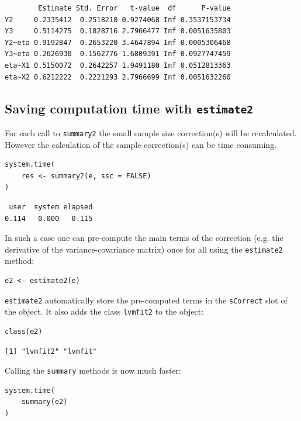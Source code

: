 \documentclass[12pt]{article}
\begin{document}
\begin{verbatim}
        Estimate Std. Error   t-value  df      P-value
Y2     0.2335412  0.2518218 0.9274068 Inf 0.3537153734
Y3     0.5114275  0.1828716 2.7966477 Inf 0.0051635803
Y2~eta 0.9192847  0.2653220 3.4647894 Inf 0.0005306468
Y3~eta 0.2626930  0.1562776 1.6809391 Inf 0.0927747459
eta~X1 0.5150072  0.2642257 1.9491180 Inf 0.0512813363
eta~X2 0.6212222  0.2221293 2.7966699 Inf 0.0051632260
\end{verbatim}

\subsection{Saving computation time with \texttt{estimate2}}
\label{sec:orgd6a6301}
For each call to \texttt{summary2} the small sample size correction(s) will
be recalculated. However the calculation of the sample correction(s)
can be time consuming.
\lstset{language=r,label= ,caption= ,captionpos=b,numbers=none}
\begin{lstlisting}
system.time(
    res <- summary2(e, ssc = FALSE)
)
\end{lstlisting}

\begin{verbatim}
 user  system elapsed 
0.114   0.000   0.115
\end{verbatim}


In such a case one can pre-compute the main terms of the correction
(e.g. the derivative of the variance-covariance matrix) once for all
using the \texttt{estimate2} method:
\lstset{language=r,label= ,caption= ,captionpos=b,numbers=none}
\begin{lstlisting}
e2 <- estimate2(e)
\end{lstlisting}

\texttt{estimate2} automatically store the pre-computed terms in the
\texttt{sCorrect} slot of the object. It also adds the class \texttt{lvmfit2} to the
object:
\lstset{language=r,label= ,caption= ,captionpos=b,numbers=none}
\begin{lstlisting}
class(e2)
\end{lstlisting}

\begin{verbatim}
[1] "lvmfit2" "lvmfit"
\end{verbatim}


Calling the  \texttt{summary} methods is now much faster:
\lstset{language=r,label= ,caption= ,captionpos=b,numbers=none}
\begin{lstlisting}
system.time(
    summary(e2)
)
\end{lstlisting}
\end{document}
